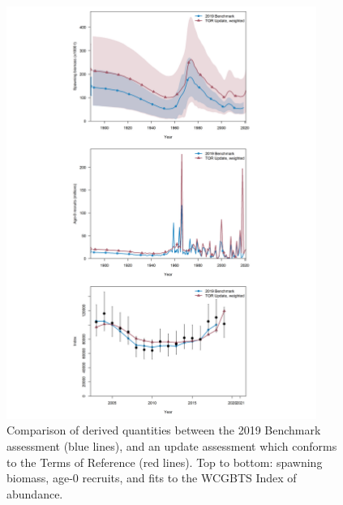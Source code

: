 \documentclass[11pt,
  english,
  a4paper,
]{article}
\begin{document}
\tagmcend\tagstructend


\begin{figure}
\centering
\includegraphics[width=0.9\textwidth,height=0.9\textheight]{figs/tora_panel.png}
\caption{Comparison of derived quantities between the 2019 Benchmark assessment (blue lines), and an update assessment which conforms to the Terms of Reference (red lines). Top to bottom: spawning biomass, age-0 recruits, and fits to the WCGBTS Index of abundance. \label{fig:torapanel}}
\end{figure}

\tagmcend\tagstructend

\end{document}
